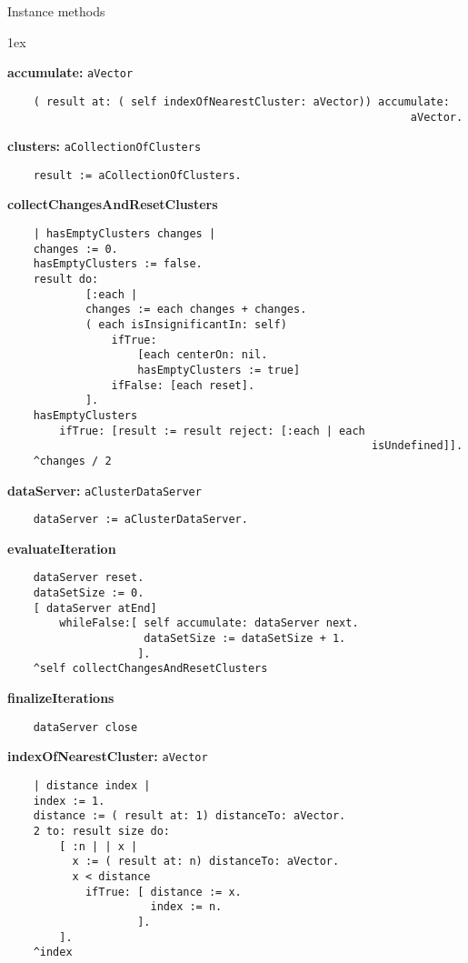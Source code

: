 Instance methods
{\parskip 1ex\par\noindent}
{\bf accumulate:} {\tt aVector}
\begin{verbatim}
    ( result at: ( self indexOfNearestCluster: aVector)) accumulate: 
                                                              aVector.

\end{verbatim}
{\bf clusters:} {\tt aCollectionOfClusters}
\begin{verbatim}
    result := aCollectionOfClusters.

\end{verbatim}
{\bf collectChangesAndResetClusters}
\begin{verbatim}
    | hasEmptyClusters changes |
    changes := 0.
    hasEmptyClusters := false.
    result do: 
            [:each | 
            changes := each changes + changes.
            ( each isInsignificantIn: self)
                ifTrue: 
                    [each centerOn: nil.
                    hasEmptyClusters := true]
                ifFalse: [each reset].
            ].
    hasEmptyClusters 
        ifTrue: [result := result reject: [:each | each 
                                                        isUndefined]].
    ^changes / 2

\end{verbatim}
{\bf dataServer:} {\tt aClusterDataServer}
\begin{verbatim}
    dataServer := aClusterDataServer.

\end{verbatim}
{\bf evaluateIteration}
\begin{verbatim}
    dataServer reset.
    dataSetSize := 0.
    [ dataServer atEnd]
        whileFalse:[ self accumulate: dataServer next.
                     dataSetSize := dataSetSize + 1.
                    ].
    ^self collectChangesAndResetClusters

\end{verbatim}
{\bf finalizeIterations}
\begin{verbatim}
    dataServer close

\end{verbatim}
{\bf indexOfNearestCluster:} {\tt aVector}
\begin{verbatim}
    | distance index |
    index := 1.
    distance := ( result at: 1) distanceTo: aVector.
    2 to: result size do:
        [ :n | | x |
          x := ( result at: n) distanceTo: aVector.
          x < distance
            ifTrue: [ distance := x.
                      index := n.
                    ].
        ].
    ^index

\end{verbatim}
